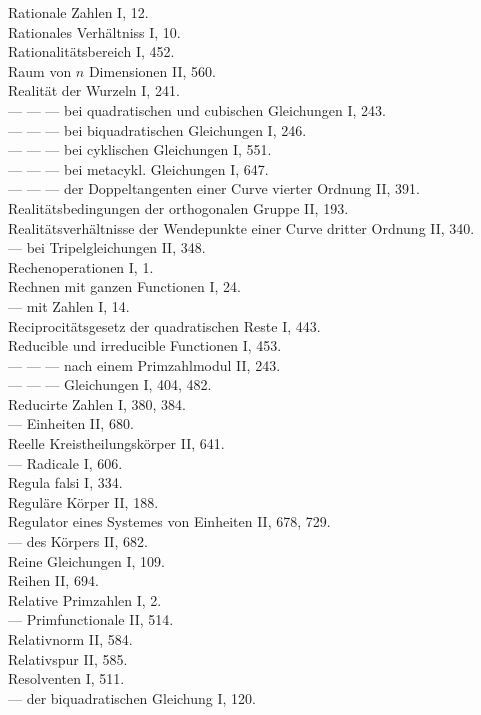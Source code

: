
\noindent
Rationale Zahlen I, 12.\\
Rationales Verhältniss I, 10.\\
Rationalitätsbereich I, 452.\\
Raum von $n$ Dimensionen II, 560.\\
Realität der Wurzeln I, 241.\\
--- --- --- bei quadratischen und cubischen Gleichungen I, 243.\\
--- --- --- bei biquadratischen Gleichungen I, 246.\\
--- --- --- bei cyklischen Gleichungen I, 551.\\
--- --- --- bei metacykl. Gleichungen I, 647.\\
--- --- --- der Doppeltangenten einer Curve vierter Ordnung II, 391.\\
Realitätsbedingungen der orthogonalen Gruppe II, 193.\\
Realitätsverhältnisse der Wendepunkte einer Curve dritter Ordnung II, 340.\\
--- bei Tripelgleichungen II, 348.\\
Rechenoperationen I, 1.\\
Rechnen mit ganzen Functionen I, 24.\\
--- mit Zahlen I, 14.\\
Reciprocitätsgesetz der quadratischen Reste I, 443.\\
Reducible und irreducible Functionen I, 453.\\
--- --- --- nach einem Primzahlmodul II, 243.\\
--- --- --- Gleichungen I, 404, 482.\\
Reducirte Zahlen I, 380, 384.\\
--- Einheiten II, 680.\\
Reelle Kreistheilungskörper II, 641.\\
--- Radicale I, 606.\\
Regula falsi I, 334.\\
Reguläre Körper II, 188.\\
Regulator eines Systemes von Einheiten II, 678, 729.\\
--- des Körpers II, 682.\\
Reine Gleichungen I, 109.\\
Reihen II, 694.\\
Relative Primzahlen I, 2.\\
--- Primfunctionale II, 514.\\
Relativnorm II, 584.\\
Relativspur II, 585.\\
Resolventen I, 511.\\
--- der biquadratischen Gleichung I, 120.

